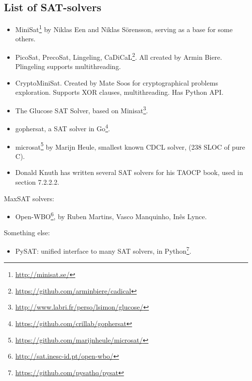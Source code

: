 \subsection{List of SAT-solvers}


\begin{itemize}

\item MiniSat\footnote{\url{http://minisat.se/}} by Niklas Een and Niklas Sörensson, serving as a base for some others.

\item PicoSat, PrecoSat, Lingeling, CaDiCaL\footnote{\url{https://github.com/arminbiere/cadical}}.
All created by Armin Biere. Plingeling supports multithreading.

\item CryptoMiniSat. Created by Mate Soos for cryptographical problems exploration.
Supports XOR clauses, multithreading.
Has Python API.

\item The Glucose SAT Solver, based on Minisat\footnote{\url{http://www.labri.fr/perso/lsimon/glucose/}}.

\item gophersat, a SAT solver in Go\footnote{\url{https://github.com/crillab/gophersat}}.

\item microsat\footnote{\url{https://github.com/marijnheule/microsat/}} by Marijn Heule, smallest known CDCL solver, (238 SLOC of pure C).

\item Donald Knuth has written several SAT solvers for his TAOCP book, used in section 7.2.2.2.

\end{itemize}

MaxSAT solvers:

\begin{itemize}

\item Open-WBO\footnote{\url{http://sat.inesc-id.pt/open-wbo/}}, by Ruben Martins, Vasco Manquinho, Inês Lynce.

\end{itemize}

Something else:

\begin{itemize}

\item PySAT: unified interface to many SAT solvers, in Python\footnote{\url{https://github.com/pysathq/pysat}}.

\end{itemize}

